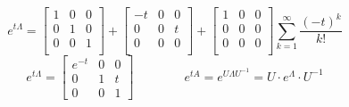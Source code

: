 \documentclass[14pt,a4paper]{scrartcl}
\theoremstyle{definition}
\theoremstyle{remark}
\theoremstyle{definition}
\theoremstyle{definition}
\begin{document}
$$
e^{t \Lambda} = \begin{bmatrix}
  1 & 0 & 0\\
  0 & 1 & 0\\
  0 & 0 & 1\\
\end{bmatrix}+  \begin{bmatrix}
  -t & 0 & 0\\
  0 & 0 & t\\
  0 & 0 & 0\\
\end{bmatrix}+ \begin{bmatrix}
  1 & 0 & 0\\
  0 & 0 & 0\\
  0 & 0 & 0\\
\end{bmatrix} \sum\limits_{k = 1}^{ \infty}{ \frac{(-t)^k}{k!}  }
$$
$$
e^{t \Lambda} = \begin{bmatrix}
 e^{-t} & 0 & 0 \\
 0 & 1 & t \\
 0 & 0 & 1
\end{bmatrix} \qquad \qquad e^{tA} = e^{U\Lambda U^{-1}} = U\cdot e^{\Lambda}\cdot U^{-1}
$$
\end{document}
